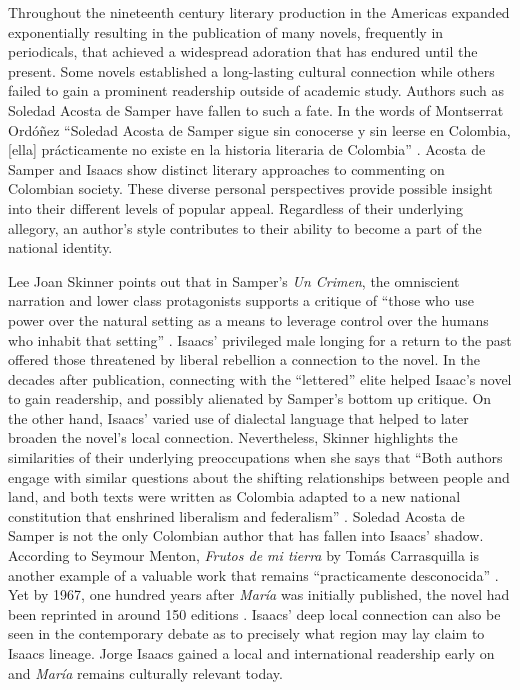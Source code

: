 \documentclass[12pt]{report}
\begin{document}
Throughout the nineteenth century literary production in the Americas expanded exponentially resulting in the publication of many novels, frequently in periodicals, that achieved a widespread adoration that has endured until the present. 
Some novels established a long-lasting cultural connection while others failed to gain a prominent readership outside of academic study. 
Authors such as Soledad Acosta de Samper have fallen to such a fate. 
In the words of Montserrat Ordóñez \enquote{Soledad Acosta de Samper sigue sin conocerse y sin leerse en Colombia, [ella] prácticamente no existe en la historia literaria de Colombia} \autocite[257]{Ordonez2005}. 
Acosta de Samper and Isaacs show distinct literary approaches to commenting on Colombian society.
These diverse personal perspectives provide possible insight into their different levels of popular appeal.
Regardless of their underlying allegory, an author’s style contributes to their ability to become a part of the national identity. 

Lee Joan Skinner points out that in Samper's \textit{Un Crimen}, the omniscient narration and lower class protagonists supports a critique of  \enquote{those who use power over the natural setting as a means to leverage control over the humans who inhabit that setting} \autocite[19]{Skinner2014}.
Isaacs’ privileged male longing for a return to the past offered those threatened by liberal rebellion a connection to the novel.
In the decades after publication, connecting with the \enquote{lettered} elite helped Isaac's novel to gain readership, and possibly alienated by Samper's bottom up critique.
On the other hand, Isaacs’ varied use of dialectal language that helped to later broaden the novel's local connection. 
Nevertheless, Skinner highlights the similarities of their underlying preoccupations when she says that \enquote{Both authors engage with similar questions about the shifting relationships between people and land, and both texts were written as Colombia adapted to a new national constitution that enshrined liberalism and federalism} \autocite[13]{Skinner2014}.
Soledad Acosta de Samper is not the only Colombian author that has fallen into Isaacs' shadow.
According to Seymour Menton, \textit{Frutos de mi tierra} by Tomás Carrasquilla is another example of a valuable work that remains \enquote{practicamente desconocida} \autocite[111]{Menton1978}. 
Yet by 1967, one hundred years after \textit{María} was initially published, the novel had been reprinted in around 150 editions \autocite[13]{McGrady2012}. 
Isaacs' deep local connection can also be seen in the contemporary debate as to precisely what region may lay claim to Isaacs lineage. 
Jorge Isaacs gained a local and international readership early on and \textit{María} remains culturally relevant today. 
\end{document}
